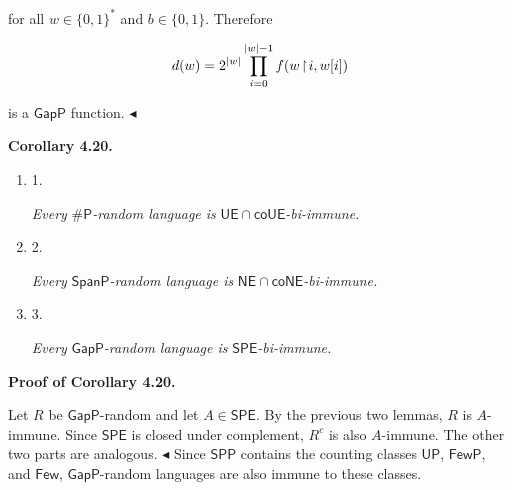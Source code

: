 for all $w\in\{0,1\}^{*}$ and $b\in\{0,1\}$. Therefore\par


\[\begin{gathered}
d(w)=2^{|w|}\prod_{i=0}^{|w|-1}f(w\negthinspace\upharpoonright\negthinspace i,w[i])
\end{gathered}\]


is a $\mathsf{GapP}$ function.
$\blacktriangleleft$\par





\par\medskip\noindent\textbf{
\textbf{Corollary 4.20}\textbf{.}
}\par



\begin{enumerate}


\item[] 
1. 


\emph{Every }${\mathsf{\#}\mathsf{P}}$\emph{-random language is }$\mathsf{UE}\cap\mathsf{co}\mathsf{UE}$\emph{-bi-immune.}\par





\item[] 
2. 


\emph{Every }$\mathsf{SpanP}$\emph{-random language is }$\mathsf{NE}\cap\mathsf{co}\mathsf{NE}$\emph{-bi-immune.}\par





\item[] 
3. 


\emph{Every }$\mathsf{GapP}$\emph{-random language is }$\mathsf{SPE}$\emph{-bi-immune.}\par





\end{enumerate}







\par\medskip\noindent\textbf{Proof of Corollary 4.20.}\par




Let $R$ be $\mathsf{GapP}$-random and let $A\in\mathsf{SPE}$. By the previous two lemmas, $R$ is $A$-immune. Since $\mathsf{SPE}$ is closed under complement, $R^{c}$ is also $A$-immune. The other two parts are analogous.
$\blacktriangleleft$
Since $\mathsf{SPP}$ contains the counting classes $\mathsf{UP}$, $\mathsf{FewP}$, and $\mathsf{Few}$, $\mathsf{GapP}$-random languages are also immune to these classes.\par







